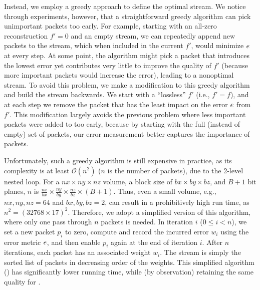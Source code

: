 Instead, we employ a greedy approach to define the optimal stream. We notice through experiments,
however, that a straightforward greedy algorithm can pick unimportant packets too early. For
example, starting with an all-zero reconstruction $f'=0$ and an empty stream, we can repeatedly
append new packets to the stream, which when included in the current $f'$, would minimize $e$ at
every step. At some point, the algorithm might pick a packet that introduces the lowest error yet
contributes very little to improve the quality of $f'$ (because more important packets would
increase the error), leading to a nonoptimal stream. To avoid this problem, we make a modification
to this greedy algorithm and build the stream backwards. We start with a ``lossless'' $f'$ (i.e.,
$f'=f$), and at each step we remove the packet that has the least impact on the error $e$ from
$f'$. This modification largely avoids the previous problem where less important packets were added
to \sopt too early, because by starting with the full (instead of empty) set of packets, our error
measurement better captures the importance of packets.

Unfortunately, such a greedy algorithm is still expensive in practice, as its complexity is at least
$\mathcal{O}(n^2)$ ($n$ is the number of packets), due to the 2-level nested loop. For a $nx\times
ny \times nz$ volume, a block size of $bx\times by\times bz$, and $B+1$ bit planes, $n$ is
$\frac{nx}{bx}\times \frac{ny}{by}\times \frac{nz}{bz} \times (B+1)$. Thus, even a small volume,
e.g., $nx,ny,nz=64$ and $bx,by,bz=2$, can result in a prohibitively high run time, as
$n^2=(32768\times 17)^2$. Therefore, we adopt a simplified version of this algorithm, where only one
pass through $n$ packets is needed. In iteration $i$ ($0\leq i < n$), we set a new packet $p_i$ to
zero, compute and record the incurred error $w_i$ using the error metric $e$, and then enable
$p_i$ again at the end of iteration $i$. After $n$ iterations, each packet has an associated weight
$w_i$. The stream \sopt is simply the sorted list of packets in decreasing order of the weights.
This simplified algorithm () has significantly lower running time, while (by
observation) retaining the same quality for \sopt.

